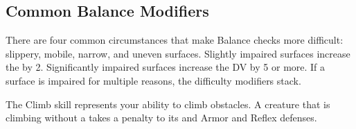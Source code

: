     \subsection{Common Balance Modifiers}
        There are four common circumstances that make Balance checks more difficult: slippery, mobile, narrow, and uneven surfaces.
        Slightly impaired surfaces increase the  by 2.
        Significantly impaired surfaces increase the DV by 5 or more.
        If a surface is impaired for multiple reasons, the difficulty modifiers stack.

\newpage
{}
    The Climb skill represents your ability to climb obstacles.
    A creature that is climbing without a  takes a  penalty to its  and Armor and Reflex defenses.

